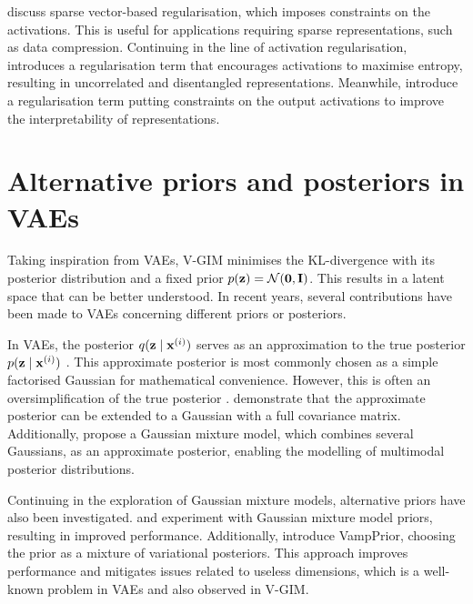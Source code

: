 	\cite{tianComprehensiveSurveyRegularization2022} discuss sparse vector-based regularisation, which imposes constraints on the activations. This is useful for applications requiring sparse representations, such as data compression. Continuing in the line of activation regularisation, \cite{tomczakLearningInformativeFeatures2016} introduces a regularisation term that encourages activations to maximise entropy, resulting in uncorrelated and disentangled representations. Meanwhile, \cite{wuImprovingInterpretabilityRegularization2018} introduce a regularisation term putting constraints on the output activations to improve the interpretability of representations.


\section{Alternative priors and posteriors in VAEs}
	Taking inspiration from VAEs, V-GIM minimises the KL-divergence with its posterior distribution and a fixed prior $p(\mathbf{z})=\mathcal{N}(\bm{\mathbf{0}}, \mathbf{I})$. This results in a latent space that can be better understood. In recent years, several contributions have been made to VAEs concerning different priors or posteriors.
	
	In VAEs, the posterior $q (\mathbf{z} \mid \mathbf{x}^{(i)})$ serves as an approximation to the true posterior $p (\mathbf{z} \mid \mathbf{x}^{(i)})$ \citep{odaiboTutorialDerivingStandard2019}. This approximate posterior is most commonly chosen as a simple factorised Gaussian for mathematical convenience. However, this is often an oversimplification of the true posterior \citep{nalisnickApproximateInferenceDeep2016a}. \cite{kingmaIntroductionVariationalAutoencoders2019} demonstrate that the approximate posterior can be extended to a Gaussian with a full covariance matrix. Additionally, \cite{nalisnickApproximateInferenceDeep2016a} propose a Gaussian mixture model, which combines several Gaussians, as an approximate posterior, enabling the modelling of multimodal posterior distributions.
	
	Continuing in the exploration of Gaussian mixture models, alternative priors have also been investigated. \cite{guoVariationalAutoencoderOptimizing2020} and \cite{leeMetaGMVAEMixtureGaussian2021} experiment with Gaussian mixture model priors, resulting in improved performance. Additionally, \cite{tomczakVAEVampPrior2018} introduce VampPrior, choosing the prior as a mixture of variational posteriors. This approach improves performance and mitigates issues related to useless dimensions, which is a well-known problem in VAEs and also observed in V-GIM.
	









